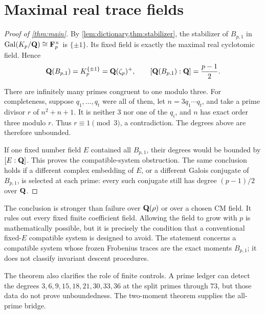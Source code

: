 \section{Maximal real trace fields}

\begin{proof}[Proof of \cref{thm:main}]
By \cref{lem:dictionary,thm:stabilizer}, the stabilizer of $B_{p,1}$ in
$\operatorname{Gal}(K_p/\mathbf Q)\cong\mathbf F_p^\times$ is $\{\pm1\}$.  Its fixed field is exactly
the maximal real cyclotomic field.  Hence
\[
 \mathbf Q(B_{p,1})=K_p^{\{\pm1\}}=\mathbf Q(\zeta_p)^+,
 \qquad
 [\mathbf Q(B_{p,1}):\mathbf Q]=\frac{p-1}{2}.
\]

There are infinitely many primes congruent to one modulo three.  For
completeness, suppose $q_1,\ldots,q_t$ were all of them, let
$n=3q_1\cdots q_t$, and take a prime divisor $r$ of $n^2+n+1$.  It is
neither $3$ nor one of the $q_i$, and $n$ has exact order three modulo $r$.
Thus $r\equiv1\pmod3$, a contradiction.  The degrees above are therefore
unbounded.

If one fixed number field $E$ contained all $B_{p,1}$, their degrees would be
bounded by $[E:\mathbf Q]$.  This proves the compatible-system obstruction.
The same conclusion holds if a different complex embedding of $E$, or a
different Galois conjugate of $B_{p,1}$, is selected at each prime: every such
conjugate still has degree $(p-1)/2$ over $\mathbf Q$.
\end{proof}

\begin{remark}
The conclusion is stronger than failure over $\mathbf Q(\rho)$ or over a chosen CM
field.  It rules out every fixed finite coefficient field.  Allowing the field
to grow with $p$ is mathematically possible, but it is precisely the condition
that a conventional fixed-$E$ compatible system is designed to avoid.  The
statement concerns a compatible system whose frozen Frobenius traces are the
exact moments $B_{p,1}$; it does not classify invariant descent procedures.
\end{remark}

The theorem also clarifies the role of finite controls.  A prime ledger can
detect the degrees
$3,6,9,15,18,21,30,33,36$ at the split primes through $73$, but those data do
not prove unboundedness.  The two-moment theorem supplies the all-prime bridge.
